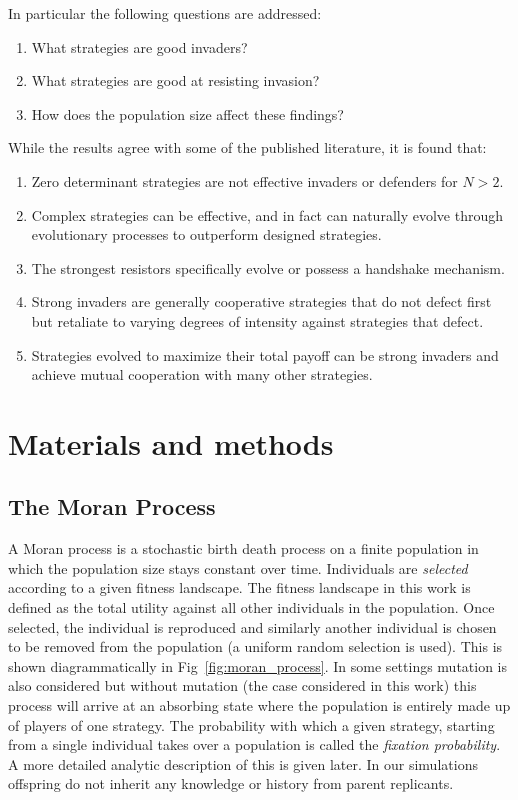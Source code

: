 \documentclass[10pt,letterpaper]{article}
\begin{document}
In particular the following questions are addressed:
\begin{enumerate}
    \item What strategies are good invaders?
    \item What strategies are good at resisting invasion?
    \item How does the population size affect these findings?
\end{enumerate}

While the results agree with some of the published literature, it is found that:

\begin{enumerate}
 \item Zero determinant strategies are not effective invaders or defenders for $N > 2$.
 \item Complex strategies can be effective, and in fact can naturally evolve
     through evolutionary processes to outperform designed strategies.
 \item The strongest resistors specifically evolve or possess a handshake mechanism.
 \item Strong invaders are generally cooperative strategies that do not defect
 first but retaliate to varying degrees of intensity against strategies that defect.
 \item Strategies evolved to maximize their total payoff can be strong invaders
 and achieve mutual cooperation with many other strategies.
\end{enumerate}

\section*{Materials and methods}
\subsection*{The Moran Process}

A Moran process is a stochastic birth death process on a finite population in which the
population size stays constant over time. Individuals are \textit{selected}
according to a given fitness landscape. The fitness landscape in this work is
defined as the total utility against all other individuals in the population.
Once selected, the individual
is reproduced and similarly another individual is chosen to be removed from the
population (a uniform random selection is used). This is shown diagrammatically
in Fig~\ref{fig:moran_process}. In some settings mutation is
also considered but without mutation (the case considered in this work) this
process will arrive at an absorbing state where the population is entirely made
up of players of one strategy. The probability with which a given strategy,
starting from a single individual takes
over a population is called the \textit{fixation probability}. A more detailed
analytic description of this is given later. In our
simulations offspring do not inherit any knowledge or history from parent
replicants.
\end{document}
